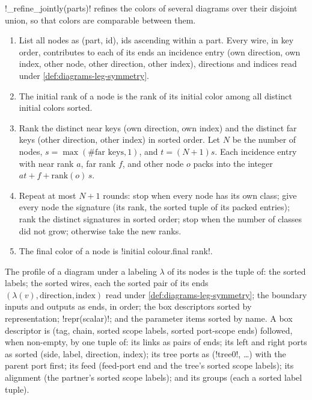 \begin{algorithm}\label{alg:diagrams-refine}
\py!_refine_jointly(parts)! refines the colors of several diagrams over their disjoint union, so that colors are comparable between them.
\begin{enumerate}
\item List all nodes as (part, id), ids ascending within a part. Every wire, in key order, contributes to each of its ends an incidence entry (own direction, own index, other node, other direction, other index), directions and indices read under \cref{def:diagrams-leg-symmetry}.
\item The initial rank of a node is the rank of its initial color among all distinct initial colors sorted.
\item Rank the distinct near keys (own direction, own index) and the distinct far keys (other direction, other index) in sorted order. Let $N$ be the number of nodes, $s=\max(\#\text{far keys},1)$, and $t=(N+1)s$. Each incidence entry with near rank $a$, far rank $f$, and other node $o$ packs into the integer $a t + f + \mathrm{rank}(o)\,s$.
\item Repeat at most $N+1$ rounds: stop when every node has its own class; give every node the signature (its rank, the sorted tuple of its packed entries); rank the distinct signatures in sorted order; stop when the number of classes did not grow; otherwise take the new ranks.
\item The final color of a node is \code!{initial colour}.{final rank}!.
\end{enumerate}
\end{algorithm}

\begin{definition}[Profile]\label{def:diagrams-profile}
The profile of a diagram under a labeling $\lambda$ of its nodes is the tuple of: the sorted labels; the sorted wires, each the sorted pair of its ends $(\lambda(v),\text{direction},\text{index})$ read under \cref{def:diagrams-leg-symmetry}; the boundary inputs and outputs as ends, in order; the box descriptors sorted by representation; \py!repr(scalar)!; and the parameter items sorted by name. A box descriptor is (tag, chain, sorted scope labels, sorted port-scope ends) followed, when non-empty, by one tuple of: its links as pairs of ends; its left and right ports as sorted (side, label, direction, index); its tree ports as (\code!tree0!, \ldots) with the parent port first; its feed (feed-port end and the tree's sorted scope labels); its alignment (the partner's sorted scope labels); and its groups (each a sorted label tuple).
\end{definition}

